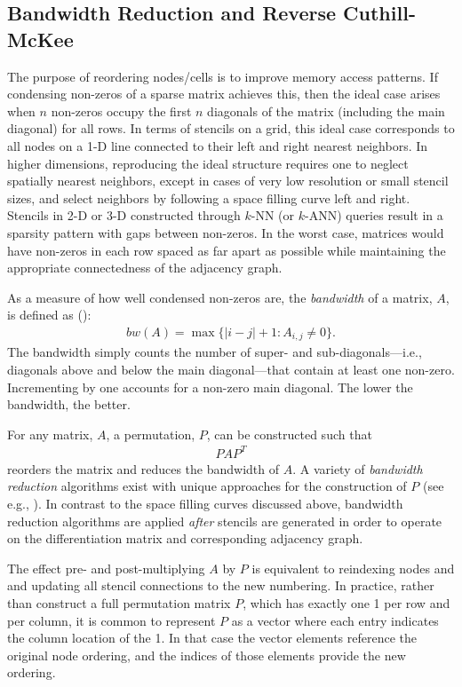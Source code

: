 \documentclass{report}
\begin{document}


\subsection{Bandwidth Reduction and Reverse Cuthill-McKee} 

The purpose of reordering nodes/cells is to improve memory access patterns. If condensing non-zeros of a sparse matrix achieves this, then the ideal case arises when $n$ non-zeros occupy the first $n$ diagonals of the matrix (including the main diagonal) for all rows. In terms of stencils on a grid, this ideal case corresponds to all nodes on a 1-D line connected to their left and right nearest neighbors. In higher dimensions, reproducing the ideal structure requires one to neglect spatially nearest neighbors, except in cases of very low resolution or small stencil sizes, and select neighbors by following a space filling curve left and right. Stencils in 2-D or 3-D constructed through $k$-NN (or $k$-ANN) queries result in a sparsity pattern with gaps between non-zeros. In the worst case, matrices would have non-zeros in each row spaced as far apart as possible while maintaining the appropriate connectedness of the adjacency graph. 


As a measure of how well condensed non-zeros are, the \emph{bandwidth} of a matrix, $A$, is defined as (\cite{Cuthill1969, LiuSherman1976}): 
\begin{align*}
bw(A) = \max\{|i - j| + 1 : A_{i,j} \neq 0\}.
\end{align*}
The bandwidth simply counts the number of super- and sub-diagonals---i.e., diagonals above and below the main diagonal---that contain at least one non-zero. Incrementing by one accounts for a non-zero main diagonal. The lower the bandwidth, the better. 

For any matrix, $A$, a permutation, $P$, can be constructed such that 
\begin{align*}
P A P^T
\end{align*}
reorders the matrix and reduces the bandwidth of $A$. A variety of \emph{bandwidth reduction} algorithms exist with unique approaches for the construction of $P$ (see e.g., \cite{Gibbs1976, LiuSherman1976, MellorCrummey2001}).  In contrast to the space filling curves discussed above, bandwidth reduction algorithms are applied \emph{after} stencils are generated in order to operate on the differentiation matrix and corresponding adjacency graph. 

The effect pre- and post-multiplying $A$ by $P$ is equivalent to reindexing nodes and and updating all stencil connections to the new numbering. In practice, rather than construct a full permutation matrix $P$, which has exactly one 1 per row and per column, it is common to represent $P$ as a vector where each entry indicates the column location of the 1. In that case the vector elements reference the original node ordering, and the indices of those elements provide the new ordering. 
\end{document}
